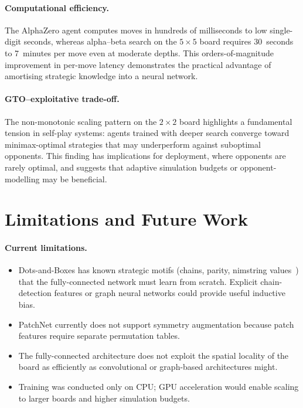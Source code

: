 \documentclass[11pt]{article}
\begin{document}
\paragraph{Computational efficiency.}
The AlphaZero agent computes moves in hundreds of milliseconds to low
single-digit seconds, whereas alpha--beta search on the $5{\times}5$
board requires 30~seconds to 7~minutes per move even at moderate depths.
This orders-of-magnitude improvement in per-move latency demonstrates
the practical advantage of amortising strategic knowledge into a neural
network.

\paragraph{GTO--exploitative trade-off.}
The non-monotonic scaling pattern on the $2{\times}2$ board highlights
a fundamental tension in self-play systems: agents trained with deeper
search converge toward minimax-optimal strategies that may underperform
against suboptimal opponents. This finding has implications for
deployment, where opponents are rarely optimal, and suggests that
adaptive simulation budgets or opponent-modelling may be beneficial.

\section{Limitations and Future Work}
\label{sec:limitations}

\paragraph{Current limitations.}
\begin{itemize}
  \item Dots-and-Boxes has known strategic motifs (chains, parity,
    nimstring values~\cite{berlekamp2000dots}) that the fully-connected
    network must learn from scratch. Explicit chain-detection features or
    graph neural networks could provide useful inductive bias.
  \item PatchNet currently does not support symmetry augmentation because
    patch features require separate permutation tables.
  \item The fully-connected architecture does not exploit the spatial
    locality of the board as efficiently as convolutional or
    graph-based architectures might.
  \item Training was conducted only on CPU; GPU acceleration would
    enable scaling to larger boards and higher simulation budgets.
\end{itemize}
\end{document}
